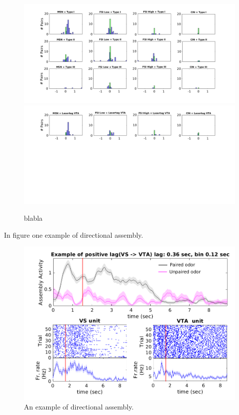 \begin{figure}[H]
\centering
\includegraphics[scale=0.4]{figures/Type_oriz.png}
\includegraphics[scale=0.4]{figures/OnlyLaserOriz.png}
\caption{blabla}
\label{fig:LagInSecAll}
\end{figure}
In figure one example of directional assembly.
\begin{figure}
    \centering
    \includegraphics[scale=0.4]{figures/1_21Lastrev1Pru_An4Poster2.png}
    \caption{An example of directional assembly.}
    \label{fig:directional_assembly}
\end{figure}


